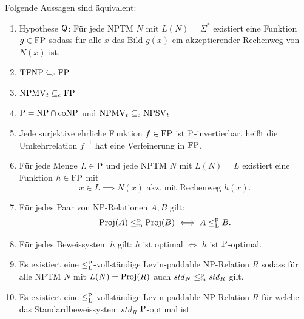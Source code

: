 \begin{theorem}\label{thm:q}
    Folgende Aussagen sind äquivalent:
    \begin{enumerate}[midpenalty=0]
        \item Hypothese $\hQ$: Für jede NPTM $N$ mit $L(N)=\Sigma^*$ existiert eine Funktion $g\in\FP$ sodass für alle $x$ das Bild $g(x)$ ein akzeptierender Rechenweg von $N(x)$ ist.
        \item $\TFNP\subseteqc \FP$
        \item $\mathrm{NPMV}_t\subseteqc \FP$
        \item $\P=\NP\cap\coNP$ und $\mathrm{NPMV}_t\subseteqc \mathrm{NPSV}_t$
        \item Jede surjektive ehrliche Funktion $f\in\FP$ ist $\P$-invertierbar, heißt die Umkehrrelation $f^{-1}$ hat eine Verfeinerung in $\FP$. 
        \item Für jede Menge $L\in \P$  und jede NPTM $N$ mit $L(N)=L$ existiert eine Funktion $h\in \FP$ mit 
            \[ x\in L \implies N(x) \text{ akz. mit Rechenweg $h(x)$}. \]
        \item Für jedes Paar von NP-Relationen $A, B$ gilt:
            \[ \Proj(A) \leqmp \Proj(B) \iff A \leqlp B. \]
        \item Für jedes Beweissystem $h$ gilt: $h$ ist optimal $\iff$ $h$ ist $\P$-optimal. 
        \item Es existiert eine $\leqlp$-vollständige Levin-paddable NP-Relation $R$ sodass für alle NPTM $N$ mit $L(N)=\Proj(R)$ auch $\mathit{std}_N\leqmp \mathit{std}_R$ gilt.
        \item Es existiert eine $\leqlp$-vollständige Levin-paddable NP-Relation $R$ für welche das Standardbeweissystem $\mathit{std}_R$ $\P$-optimal ist.
    \end{enumerate}
\end{theorem}
